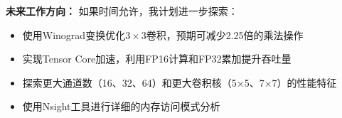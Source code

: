 \documentclass[a4paper]{article}
\begin{document}
\textbf{未来工作方向：}
如果时间允许，我计划进一步探索：
\begin{itemize}
    \item 使用Winograd变换优化$3\times 3$卷积，预期可减少2.25倍的乘法操作
    \item 实现Tensor Core加速，利用FP16计算和FP32累加提升吞吐量
    \item 探索更大通道数（16、32、64）和更大卷积核（5×5、7×7）的性能特征
    \item 使用Nsight工具进行详细的内存访问模式分析
\end{itemize}



\end{document}
